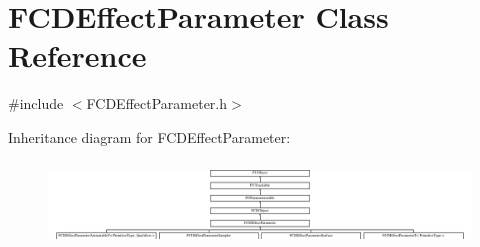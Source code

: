 \hypertarget{classFCDEffectParameter}{
\section{FCDEffectParameter Class Reference}
\label{classFCDEffectParameter}
}


{\ttfamily \#include $<$FCDEffectParameter.h$>$}

Inheritance diagram for FCDEffectParameter:\begin{figure}[H]
\begin{center}
\leavevmode
\includegraphics[height=2.270270cm]{classFCDEffectParameter}
\end{center}
\end{figure}
